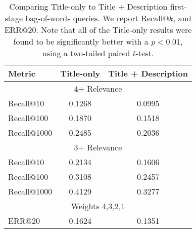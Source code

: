 \begin{table}[!t]
\centering
\caption{
Comparing Title-only to Title + Description first-stage bag-of-words queries.
We report Recall@$k$, and ERR@$20$. Note that all of the Title-only 
results were found to be significantly better with a $p < 0.01$,
using a two-tailed paired $t$-test.}
\label{tab:titlevsfull}
\begin{tabular}{lcc}
\toprule
{\bf Metric} & {\bf Title-only} & {\bf Title + Description}\\
\midrule
\multicolumn{3}{c}{4+ Relevance}\\
\midrule
Recall@10   & 0.1268 & 0.0995\\
Recall@100  & 0.1870 & 0.1518\\
Recall@1000 & 0.2485 & 0.2036\\
\midrule
\multicolumn{3}{c}{3+ Relevance}\\
\midrule
Recall@10   & 0.2134 & 0.1606\\
Recall@100  & 0.3108 & 0.2457\\
Recall@1000 & 0.4129 & 0.3277\\
\midrule
\multicolumn{3}{c}{Weights 4,3,2,1}\\
\midrule
ERR@20      & 0.1624 & 0.1351\\
\bottomrule
\end{tabular}
\end{table}

